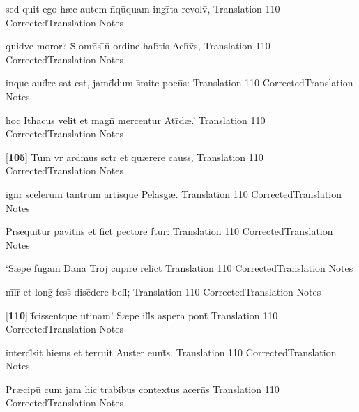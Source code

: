\latline
  {sed quit ego h{\ae}c autem n\={}qu\={\macron {\i}}quam ingr\={}ta revolv\={},}
  { Translation }
  {110}
  { CorrectedTranslation }
  { Notes }


\latline
  {quidve moror?  S\={\macron {\i}} omn\={\macron {\i}}s \={}n\={} ordine hab\={}tis Ach\={\macron {\i}}v\={}s,}
  { Translation }
  {110}
  { CorrectedTranslation }
  { Notes }


\latline
  {inque aud\={\macron {\i}}re sat est, jamd\={}dum s\={}mite poen\={}s:}
  { Translation }
  {110}
  { CorrectedTranslation }
  { Notes }


\latline
  {hoc Ithacus velit et magn\={} mercentur Atr\={\macron {\i}}d{\ae}.'}
  { Translation }
  {110}
  { CorrectedTranslation }
  { Notes }


\latline
  {[\textbf{105}] Tum v\={}r\={} ard\={}mus sc\={\macron {\i}}t\={}r\={\macron {\i}} et qu{\ae}rere caus\={}s,}
  { Translation }
  {110}
  { CorrectedTranslation }
  { Notes }


\latline
  {ign\={}r\={\macron {\i}} scelerum tant\={}rum artisque Pelasg{\ae}.}
  { Translation }
  {110}
  { CorrectedTranslation }
  { Notes }


\latline
  {Pr\={}sequitur pavit\={}ns et fict\={} pectore f\={}tur:}
  { Translation }
  {110}
  { CorrectedTranslation }
  { Notes }


\latline
  {`S{\ae}pe fugam Dana\={\macron {\i}} Troj\={} cupi\={}re relict\={}}
  { Translation }
  {110}
  { CorrectedTranslation }
  { Notes }


\latline
  {m\={}l\={\macron {\i}}r\={\macron {\i}} et long\={} fess\={\macron {\i}} disc\={}dere bell\={};}
  { Translation }
  {110}
  { CorrectedTranslation }
  { Notes }


\latline
  {[\textbf{110}] f\={}cissentque utinam!  S{\ae}pe ill\={}s aspera pont\={\macron {\i}}}
  { Translation }
  {110}
  { CorrectedTranslation }
  { Notes }


\latline
  {intercl\={}sit hiems et terruit Auster eunt\={\macron {\i}}s.}
  { Translation }
  {110}
  { CorrectedTranslation }
  { Notes }


\latline
  {Pr{\ae}cipu\={} cum jam hic trabibus contextus acern\={\macron {\i}}s}
  { Translation }
  {110}
  { CorrectedTranslation }
  { Notes }


